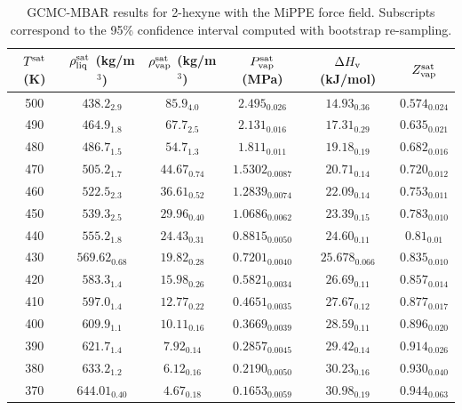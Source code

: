 \documentclass[journal=jctc,manuscript=article]{achemso}
\begin{document}
\begin{table}[htb!]
	\caption{GCMC-MBAR results for 2-hexyne with the MiPPE force field. Subscripts correspond to the 95\% confidence interval computed with bootstrap re-sampling.}
	\begin{center}
		\begin{tabular}{|c|c|c|c|c|c|}
			\hline
			$T^{\rm sat}$ (K) & $\rho_{\rm liq}^{\rm sat}$ (kg/m$^3$) & $\rho_{\rm vap}^{\rm sat}$ (kg/m$^3$) & $P_{\rm vap}^{\rm sat}$ (MPa) & $\Delta H_{\rm v}$ (kJ/mol) & $Z_{\rm vap}^{\rm sat}$ \\ \hline
			500 & $438.2_{2.9}$ & $85.9_{4.0}$ & $2.495_{0.026}$ & $14.93_{0.36}$ & $0.574_{0.024}$ \\
			490 & $464.9_{1.8}$ & $67.7_{2.5}$ & $2.131_{0.016}$ & $17.31_{0.29}$ & $0.635_{0.021}$ \\
			480 & $486.7_{1.5}$ & $54.7_{1.3}$ & $1.811_{0.011}$ & $19.18_{0.19}$ & $0.682_{0.016}$ \\
			470 & $505.2_{1.7}$ & $44.67_{0.74}$ & $1.5302_{0.0087}$ & $20.71_{0.14}$ & $0.720_{0.012}$ \\
			460 & $522.5_{2.3}$ & $36.61_{0.52}$ & $1.2839_{0.0074}$ & $22.09_{0.14}$ & $0.753_{0.011}$ \\
			450 & $539.3_{2.5}$ & $29.96_{0.40}$ & $1.0686_{0.0062}$ & $23.39_{0.15}$ & $0.783_{0.010}$ \\
			440 & $555.2_{1.8}$ & $24.43_{0.31}$ & $0.8815_{0.0050}$ & $24.60_{0.11}$ & $0.81_{0.01}$ \\
			430 & $569.62_{0.68}$ & $19.82_{0.28}$ & $0.7201_{0.0040}$ & $25.678_{0.066}$ & $0.835_{0.010}$ \\
			420 & $583.3_{1.4}$ & $15.98_{0.26}$ & $0.5821_{0.0034}$ & $26.69_{0.11}$ & $0.857_{0.014}$ \\
			410 & $597.0_{1.4}$ & $12.77_{0.22}$ & $0.4651_{0.0035}$ & $27.67_{0.12}$ & $0.877_{0.017}$ \\
			400 & $609.9_{1.1}$ & $10.11_{0.16}$ & $0.3669_{0.0039}$ & $28.59_{0.11}$ & $0.896_{0.020}$ \\
			390 & $621.7_{1.4}$ & $7.92_{0.14}$ & $0.2857_{0.0045}$ & $29.42_{0.14}$ & $0.914_{0.026}$ \\
			380 & $633.2_{1.2}$ & $6.12_{0.16}$ & $0.2190_{0.0050}$ & $30.23_{0.16}$ & $0.930_{0.040}$ \\
			370 & $644.01_{0.40}$ & $4.67_{0.18}$ & $0.1653_{0.0059}$ & $30.98_{0.19}$ & $0.944_{0.063}$ \\
			\hline
		\end{tabular}
	\end{center}
\end{table}
\end{document}
